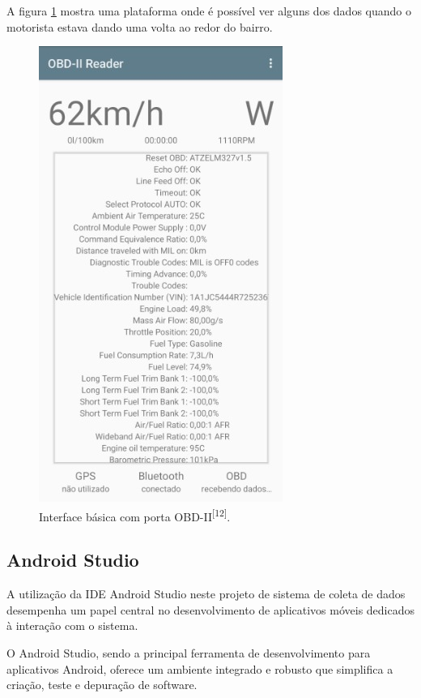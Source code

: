     A figura \ref{fig:obd2_plataforma} mostra uma plataforma onde é possível ver alguns dos dados quando o motorista estava dando uma volta ao redor do bairro.

\begin{figure}[hp]
    \centering
    
    \includegraphics[scale=0.5]{figures/obd2.jpeg}
    
    \caption{Interface básica com porta OBD-II\textsuperscript{[12]}.}
    
    \label{fig:obd2_plataforma}
\end{figure}
    
    \subsection{Android Studio} A utilização da IDE Android Studio neste projeto de sistema de coleta de dados desempenha um papel central no desenvolvimento de aplicativos móveis dedicados à interação com o sistema. 
    
    O Android Studio, sendo a principal ferramenta de desenvolvimento para aplicativos Android, oferece um ambiente integrado e robusto que simplifica a criação, teste e depuração de software. 
    
